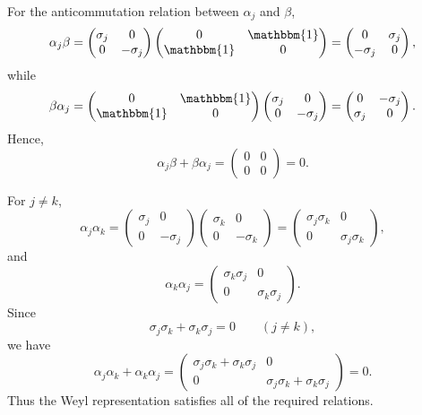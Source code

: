 \documentclass[12pt,a4paper]{article}
\begin{document}
\begin{solution_pset}
		For the anticommutation relation between $\alpha_j$ and $\beta$,
		\[
			\alpha_j\beta
			=
			\begin{pmatrix}
				\sigma_j&0\\
				0&-\sigma_j
			\end{pmatrix}
			\begin{pmatrix}
				0&\mathbbm{1}\\
				\mathbbm{1}&0
			\end{pmatrix}
			=
			\begin{pmatrix}
				0&\sigma_j\\
				-\sigma_j&0
			\end{pmatrix},
		\]
		while
		\[
			\beta\alpha_j
			=
			\begin{pmatrix}
				0&\mathbbm{1}\\
				\mathbbm{1}&0
			\end{pmatrix}
			\begin{pmatrix}
				\sigma_j&0\\
				0&-\sigma_j
			\end{pmatrix}
			=
			\begin{pmatrix}
				0&-\sigma_j\\
				\sigma_j&0
			\end{pmatrix}.
		\]
		Hence,
		\[
			\alpha_j\beta+\beta\alpha_j
			=
			\begin{pmatrix}
				0&0\\
				0&0
			\end{pmatrix}
			=0.
		\]

		For $j\neq k$,
		\[
			\alpha_j\alpha_k
			=
			\begin{pmatrix}
				\sigma_j&0\\
				0&-\sigma_j
			\end{pmatrix}
			\begin{pmatrix}
				\sigma_k&0\\
				0&-\sigma_k
			\end{pmatrix}
			=
			\begin{pmatrix}
				\sigma_j\sigma_k&0\\
				0&\sigma_j\sigma_k
			\end{pmatrix},
		\]
		and
		\[
			\alpha_k\alpha_j
			=
			\begin{pmatrix}
				\sigma_k\sigma_j&0\\
				0&\sigma_k\sigma_j
			\end{pmatrix}.
		\]
		Since
		\[
			\sigma_j\sigma_k+\sigma_k\sigma_j=0
			\qquad (j\neq k),
		\]
		we have
		\[
			\alpha_j\alpha_k+\alpha_k\alpha_j
			=
			\begin{pmatrix}
				\sigma_j\sigma_k+\sigma_k\sigma_j&0\\
				0&\sigma_j\sigma_k+\sigma_k\sigma_j
			\end{pmatrix}
			=0.
		\]
		Thus the Weyl representation satisfies all of the required relations.


\end{solution_pset}
\end{document}
